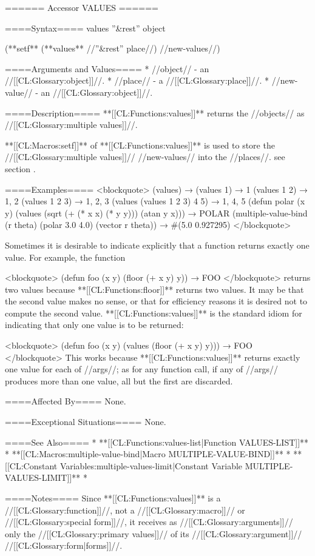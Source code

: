 ====== Accessor VALUES ======

====Syntax====
\DefunWithValues values {''&rest'' object} {}

(**setf** (**values** //''&rest'' place//) //new-values//)

====Arguments and Values====
  * //object// - an //[[CL:Glossary:object]]//.
  * //place// - a //[[CL:Glossary:place]]//.
  * //new-value// - an //[[CL:Glossary:object]]//.

====Description====
**[[CL:Functions:values]]** returns the //objects// as //[[CL:Glossary:multiple values]]//.

**[[CL:Macros:setf]]** of **[[CL:Functions:values]]** is used to store the //[[CL:Glossary:multiple values]]// //new-values// into the //places//. see section {\secref\SETFofVALUES}.

====Examples====
<blockquote> (values) → \novalues (values 1) → 1 (values 1 2) → 1, 2 (values 1 2 3) → 1, 2, 3 (values (values 1 2 3) 4 5) → 1, 4, 5 (defun polar (x y) (values (sqrt (+ (* x x) (* y y))) (atan y x))) → POLAR (multiple-value-bind (r theta) (polar 3.0 4.0) (vector r theta)) → #(5.0 0.927295) </blockquote>

Sometimes it is desirable to indicate explicitly that a function returns exactly one value. For example, the function

<blockquote> (defun foo (x y) (floor (+ x y) y)) → FOO </blockquote> returns two values because **[[CL:Functions:floor]]** returns two values. It may be that the second value makes no sense, or that for efficiency reasons it is desired not to compute the second value. **[[CL:Functions:values]]** is the standard idiom for indicating that only one value is to be returned:

<blockquote> (defun foo (x y) (values (floor (+ x y) y))) → FOO </blockquote> This works because **[[CL:Functions:values]]** returns exactly one value for each of //args//; as for any function call, if any of //args// produces more than one value, all but the first are discarded.

====Affected By====
None.

====Exceptional Situations====
None.

====See Also====
  * **[[CL:Functions:values-list|Function VALUES-LIST]]**
  * **[[CL:Macros:multiple-value-bind|Macro MULTIPLE-VALUE-BIND]]**
  * **[[CL:Constant Variables:multiple-values-limit|Constant Variable MULTIPLE-VALUES-LIMIT]]**
  * {\secref\Evaluation}

====Notes====
Since **[[CL:Functions:values]]** is a //[[CL:Glossary:function]]//, not a //[[CL:Glossary:macro]]// or //[[CL:Glossary:special form]]//, it receives as //[[CL:Glossary:arguments]]// only the //[[CL:Glossary:primary values]]// of its //[[CL:Glossary:argument]]// //[[CL:Glossary:form|forms]]//.

  
